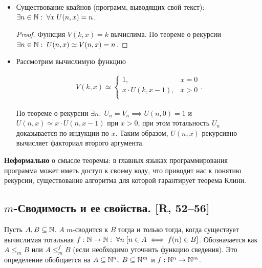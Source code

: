 \documentclass[a4paper, fleqn]{article}
\newcommand{\mred}{\leqslant_m} %
\begin{document}
        \begin{itemize}
            \item \begin{example}
                Существование квайнов (программ, выводящих свой текст): $\exists n \in \mathbb{N} : \; \forall x \; U(n, x) = n$.
            \end{example}

            \begin{proof}
                Функция $V(k, x) = k$ вычислима. По теореме о рекурсии $\exists n \in \mathbb{N} : \; U(n, x) \simeq V(n, x) = n$.
            \end{proof}

            \item \begin{example}
            Рассмотрим вычислимую функцию

            \begin{equation*}
            \begin{gathered}
            V(k, x) \simeq
            \begin{cases}
            1, & x = 0 \\
            x \cdot U(k, x - 1), & x > 0 \\
            \end{cases}.
            \end{gathered}
            \end{equation*}

            По теореме о рекурсии $\exists n : \; U_n = V_n \implies U(n, 0) = 1$ и $U(n, x) \simeq x \cdot U(n, x - 1)$ при $x > 0$, при этом тотальность $U_n$ доказывается по индукции по $x$. Таким образом, $U(n, x)$ рекурсивно вычисляет факториал второго аргумента.
        \end{example}
        \end{itemize}

        \textbf{Неформально} о смысле теоремы: в главных языках программирования программа может иметь доступ к своему коду, что приводит нас к понятию рекурсии, существование алгоритма для которой гарантирует теорема Клини.

    \subsection{$m$-Сводимость и ее свойства. [R, 52–56]}

        \begin{definition}
        Пусть $A, B \subseteq \mathbb{N}$. $A \; m$-сводится к $B$ тогда и только тогда, когда существует вычислимая тотальная $f : \mathbb{N} \to \mathbb{N}: \; \forall n \; [n \in A \iff f(n) \in B]$. Обозначается как $A \mred B$ или $A \mred^f B$ (если необходимо уточнить функцию сведения). Это определение обобщается на $A \subseteq \mathbb{N}^n, \; B \subseteq \mathbb{N}^m$ и $f : \mathbb{N}^n \to \mathbb{N}^m$.
        \end{definition}
\end{document}
